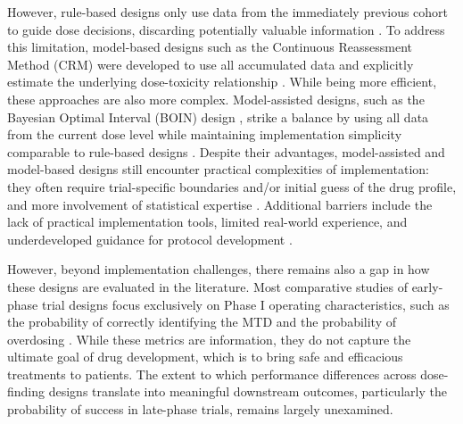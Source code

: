 \documentclass[11pt]{article}
\begin{document}
However, rule-based designs only use data from the immediately previous cohort to guide dose decisions, discarding potentially valuable information \parencite{clertant2022early}. To address this limitation, model-based designs such as the Continuous Reassessment Method (CRM) were developed to use all accumulated data and explicitly estimate the underlying dose-toxicity relationship \parencite{CRM,EWOC,review_model_based_design}. While being more efficient, these approaches are also more complex. Model-assisted designs, such as the Bayesian Optimal Interval (BOIN) design \parencite{BOIN}, strike a balance by using all data from the current dose level while maintaining implementation simplicity comparable to rule-based designs \parencite{review_model_assisted_design}. Despite their advantages, model-assisted and model-based designs still encounter practical complexities of implementation: they often require trial-specific boundaries and/or initial guess of the drug profile, and more involvement of statistical expertise \parencite{clertant2022early}. Additional barriers include the lack of practical implementation tools, limited real-world experience, and underdeveloped guidance for protocol development \parencite{petroni2017implementation}.

However, beyond implementation challenges, there remains also a gap in how these designs are evaluated in the literature. Most comparative studies of early-phase trial designs focus exclusively on Phase I operating characteristics, such as the probability of correctly identifying the MTD and the probability of overdosing \parencite{horton2017performance,iasonos2008comprehensive,van2016performance,zhou2018comparative}. While these metrics are information, they do not capture the ultimate goal of drug development, which is to bring safe and efficacious treatments to patients. The extent to which performance differences across dose-finding designs translate into meaningful downstream outcomes, particularly the probability of success in late-phase trials, remains largely unexamined.
\end{document}

